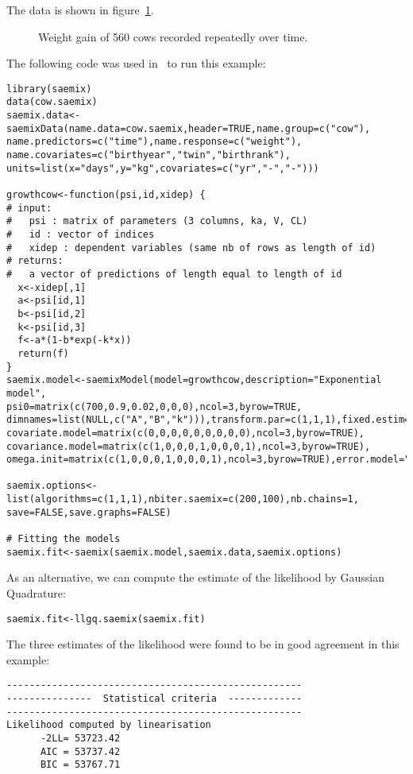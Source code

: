 {The data is shown in figure~\ref{fig:cowdata}.

\begin{figure}[!h]
\begin{center}
\end{center}
\caption{Weight gain of 560 cows recorded repeatedly over time.} \label{fig:cowdata}
\end{figure}

The following code was used in \R~to run this example:
\begin{verbatim}
library(saemix)
data(cow.saemix)
saemix.data<-saemixData(name.data=cow.saemix,header=TRUE,name.group=c("cow"), 
name.predictors=c("time"),name.response=c("weight"), 
name.covariates=c("birthyear","twin","birthrank"), 
units=list(x="days",y="kg",covariates=c("yr","-","-")))

growthcow<-function(psi,id,xidep) {
# input:
#   psi : matrix of parameters (3 columns, ka, V, CL)
#   id : vector of indices 
#   xidep : dependent variables (same nb of rows as length of id)
# returns:
#   a vector of predictions of length equal to length of id
  x<-xidep[,1]
  a<-psi[id,1]
  b<-psi[id,2]
  k<-psi[id,3]
  f<-a*(1-b*exp(-k*x))
  return(f)
}
saemix.model<-saemixModel(model=growthcow,description="Exponential model",  
psi0=matrix(c(700,0.9,0.02,0,0,0),ncol=3,byrow=TRUE, 
dimnames=list(NULL,c("A","B","k"))),transform.par=c(1,1,1),fixed.estim=c(1,1,1), 
covariate.model=matrix(c(0,0,0,0,0,0,0,0,0),ncol=3,byrow=TRUE), 
covariance.model=matrix(c(1,0,0,0,1,0,0,0,1),ncol=3,byrow=TRUE), 
omega.init=matrix(c(1,0,0,0,1,0,0,0,1),ncol=3,byrow=TRUE),error.model="constant")

saemix.options<-list(algorithms=c(1,1,1),nbiter.saemix=c(200,100),nb.chains=1,
save=FALSE,save.graphs=FALSE)

# Fitting the models
saemix.fit<-saemix(saemix.model,saemix.data,saemix.options)
\end{verbatim}

\par \kern -0.2cm
As an alternative, we can compute the estimate of the likelihood by Gaussian Quadrature:
\begin{verbatim}
saemix.fit<-llgq.saemix(saemix.fit)
\end{verbatim}
The three estimates of the likelihood were found to be in good agreement in this example:
\begin{verbatim}
----------------------------------------------------
---------------  Statistical criteria  -------------
----------------------------------------------------
Likelihood computed by linearisation
      -2LL= 53723.42 
      AIC = 53737.42 
      BIC = 53767.71 


\end{verbatim}}
